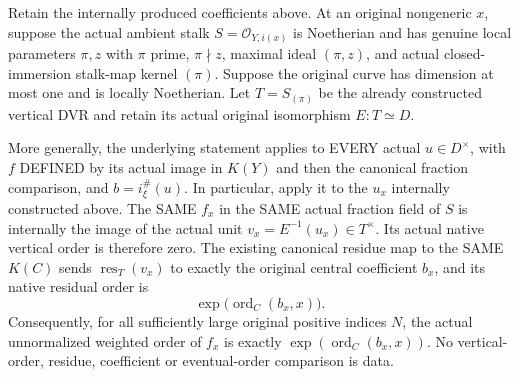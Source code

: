 \begin{theorem}
\label{thm:intrinsic-numerical-two-frame-leading-line-order}
\leanok
{}
Retain the internally produced coefficients above. At an original
nongeneric $x$, suppose the actual ambient stalk
$S=\mathcal O_{Y,i(x)}$ is Noetherian and has genuine local parameters
$\pi,z$ with $\pi$ prime, $\pi\nmid z$, maximal ideal $(\pi,z)$, and actual
closed-immersion stalk-map kernel $(\pi)$. Suppose the original curve has
dimension at most one and is locally Noetherian. Let $T=S_{(\pi)}$ be the
already constructed vertical DVR and retain its actual original
isomorphism $E:T\simeq D$.

More generally, the underlying statement applies to EVERY actual
$u\in D^\times$, with $f$ DEFINED by its actual image in $K(Y)$ and then
the canonical fraction comparison, and $b=i_\xi^\#(u)$. In particular,
apply it to the $u_x$ internally constructed above. The SAME $f_x$ in
the SAME actual fraction field of $S$ is internally the image of the
actual unit $v_x=E^{-1}(u_x)\in T^\times$. Its actual native
vertical order is therefore zero. The existing canonical residue map to
the SAME $K(C)$ sends $\operatorname{res}_T(v_x)$ to exactly the original
central coefficient $b_x$, and its native residual order is
\[
 \exp\bigl(\operatorname{ord}_C(b_x,x)\bigr).
\]
Consequently, for all sufficiently large original positive indices $N$,
the actual unnormalized weighted order of $f_x$ is exactly
$\exp(\operatorname{ord}_C(b_x,x))$.
No vertical-order, residue, coefficient or eventual-order comparison is data.
\end{theorem}
